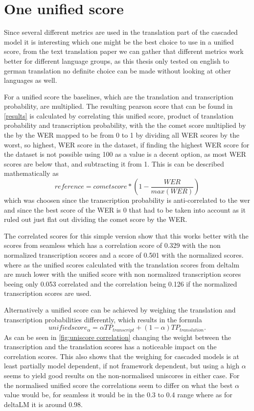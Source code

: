\section{One unified score}
Since several different metrics are used in the translation part of the cascaded model it is interesting which one might be the best choice to use in a unified score, from the text translation paper \cite{fomicheva2020unsupervised} we can gather that different metrics work better for different language groups, as this thesis only tested on english to german translation no definite choice can be made without looking at other languages as well.


For a unified score the baselines, which are the translation and transcription probability, are multiplied. 
The resulting pearson score that can be found in \autoref{results} is calculated by correlating this unified score, product of translation probability and transcription probability, with the the comet score multiplied by the by the WER mapped to be from 0 to 1 by dividing all WER scores by the worst, so highest, WER score in the dataset, if finding the highest WER score for the dataset is not possible using 100 as a value is a decent option, as most WER scores are below that, and subtracting it from 1. 
This is can be described mathematically as 
$$reference = cometscore*(1-\frac{WER}{max(WER)})$$
which was choosen since the transcription probability is anti-correlated to the wer and since the best score of the WER is 0 that had to be taken into account as it ruled out just flat out dividing the comet score by the WER.

The correlated scores for this simple version show that this works better with the scores from seamless which has a correlation score of 0.329 with the non normalized transcription scores and a score of 0.501 with the normalized scores. where as the unified scores calculated with the translation scores from deltalm are much lower with the unified score with non normalized transcription scores beeing only 0.053 correlated and the correlation being 0.126 if the normalized transcription scores are used. 

Alternatively a unified score can be achieved by weighing the translation and transcription probabilities differently, which results in the formula $$unifiedscore_\alpha= \alpha TP_{transcript} + (1-\alpha)TP_{translation}.$$ 
As can be seen in \autoref{fig:uniscore correlation} changing the weight between the transcription and the translation scores has a noticeable impact on the correlation scores. 
This also shows that the weighing for cascaded models is at least partially model dependent, if not framework dependent, but using a high $\alpha$ seems to yield good results on the non-normalised uniscores in either case. 
For the normalised unified score the correlations seem to differ on what the best $\alpha$ value would be, for seamless it would be in the 0.3 to 0.4 range where as for deltaLM it is around 0.98. 

